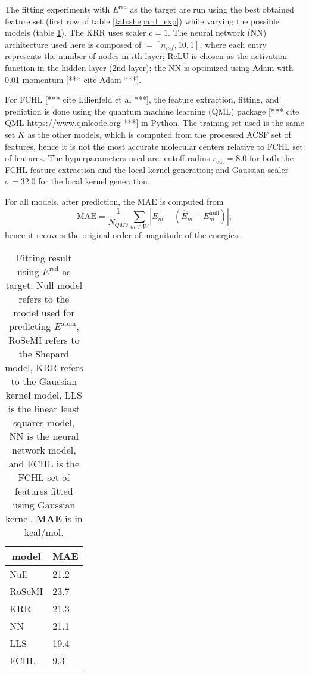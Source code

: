 \documentclass[12pt]{article}
\def\att{                    %
        \marginpar[ \hspace*{\fill} \raisebox{-0.2em}{\rule{2mm}{1.2em}} ]
        {\raisebox{-0.2em}{\rule{2mm}{1.2em}} }
        }
\def\at#1{[*** \att #1 ***]}  %
\begin{document}
The fitting experiments with $E^\text{red}$ as the target are run using the best obtained feature set (first row of table \ref{tab:shepard_exp}) while varying the possible models (table \ref{tab:red_exp}). The KRR uses scaler $c=1$. The neural network (NN) architecture used here is composed of $ = [n_{mf}, 10, 1]$, where each entry represents the number of nodes in $i$th layer; ReLU is chosen as the activation function in the hidden layer (2nd layer); the NN is optimized using Adam with 0.01 momentum \at{cite Adam}. 

For FCHL \at{cite Lilienfeld et al}, the feature extraction, fitting, and prediction is done using the quantum machine learning (QML) package \at{cite QML \url{https://www.qmlcode.org}} in Python. The training set used is the same set $K$ as the other models, which is computed from the processed ACSF set of features, hence it is not the most accurate molecular centers relative to FCHL set of features.
The hyperparameters used are: cutoff radius $r_\text{cut} = 8.0$ for both the FCHL feature extraction and the local kernel generation; and Gaussian scaler $\sigma = 32.0$ for the local kernel generation.

For all models, after prediction, the MAE is computed from
\begin{equation}
	\text{MAE} = \frac{1}{N_{QM9}} \sum_{m \in W} |E_m - (\hat{E}_m + E_m^\text{null})|,
\end{equation}
hence it recovers the original order of magnitude of the energies.

\begin{table}[H]
	\centering
	\caption{Fitting result using $E^\text{red}$ as target. Null model refers to the model used for predicting $E^\text{atom}$, RoSeMI refers to the Shepard model, KRR refers to the Gaussian kernel model, LLS is the linear least squares model, NN is the neural network model, and FCHL is the FCHL set of features fitted using Gaussian kernel. \textbf{MAE} is in kcal/mol.}
	\begin{tabular}{|l|l|}
		\hline
		\multicolumn{1}{|c|}{\textbf{model}} & \multicolumn{1}{|c|}{\textbf{MAE}} \\ \hline
		Null & 21.2 \\ \hline
		RoSeMI & 23.7 \\ \hline
		KRR & 21.3 \\ \hline
		NN & 21.1 \\ \hline
		LLS & 19.4 \\ \hline
		FCHL & 9.3 \\ \hline
	\end{tabular}
	\label{tab:red_exp}
\end{table}
\end{document}
